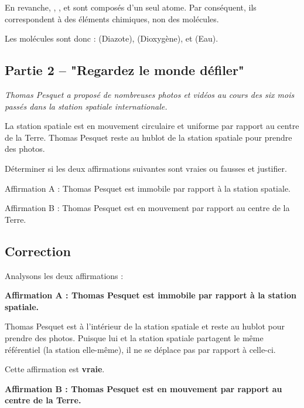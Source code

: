 \documentclass[answers]{exam}
\begin{document}
\begin{questions}
\begin{solution}
En revanche, , , et  sont composés d'un seul atome. Par conséquent, ils correspondent à des éléments chimiques, non des molécules.

Les molécules sont donc :  (Diazote),  (Dioxygène), et  (Eau).
\end{solution}

\subsection*{Partie 2 – "Regardez le monde défiler"}
  
\textit{Thomas Pesquet a proposé de nombreuses photos et vidéos au cours des six mois passés dans la station spatiale internationale.}

  \question[4] La station spatiale est en mouvement circulaire et uniforme par rapport au centre de la Terre. Thomas Pesquet reste au hublot de la station spatiale pour prendre des photos.
  
  Déterminer si les deux affirmations suivantes sont vraies ou fausses et justifier.
  
  \begin{compactitem}
  \item Affirmation A : Thomas Pesquet est immobile par rapport à la station spatiale.
  \item Affirmation B : Thomas Pesquet est en mouvement par rapport au centre de la Terre.
  \end{compactitem}
  
  

\begin{solution}
\subsection*{Correction}

Analysons les deux affirmations :

\begin{compactitem}
\item \textbf{Affirmation A : Thomas Pesquet est immobile par rapport à la station spatiale.}

Thomas Pesquet est à l'intérieur de la station spatiale et reste au hublot pour prendre des photos. Puisque lui et la station spatiale partagent le même référentiel (la station elle-même), il ne se déplace pas par rapport à celle-ci. 

Cette affirmation est \textbf{vraie}.

\item \textbf{Affirmation B : Thomas Pesquet est en mouvement par rapport au centre de la Terre.}


\end{compactitem}
\end{solution}
\end{questions}
\end{document}
